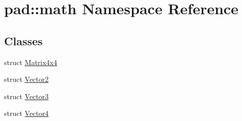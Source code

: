 \hypertarget{namespacepad_1_1math}{}\section{pad\+:\+:math Namespace Reference}
\label{namespacepad_1_1math}
\subsection*{Classes}
\begin{DoxyCompactItemize}
\item 
struct \mbox{\hyperlink{structpad_1_1math_1_1_matrix4x4}{Matrix4x4}}
\item 
struct \mbox{\hyperlink{structpad_1_1math_1_1_vector2}{Vector2}}
\item 
struct \mbox{\hyperlink{structpad_1_1math_1_1_vector3}{Vector3}}
\item 
struct \mbox{\hyperlink{structpad_1_1math_1_1_vector4}{Vector4}}
\end{DoxyCompactItemize}
